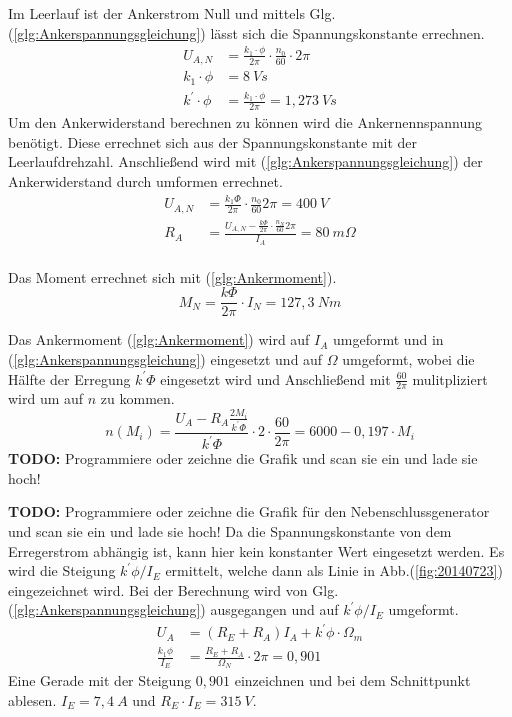 \begin{solution}
\begin{compactenum}
\item Im Leerlauf ist der Ankerstrom Null und mittels Glg.(\ref{glg:Ankerspannungsgleichung}) lässt sich die Spannungskonstante errechnen.
\begin{align}
U_{A,N} &= \frac{k_1 \cdot \phi}{2 \pi} \cdot \frac{n_0}{60} \cdot 2 \pi\\
k_1 \cdot \phi &= 8~Vs\\
k^{'} \cdot \phi &= \frac{k_1 \cdot \phi}{2 \pi} = 1,273~Vs
\end{align}
Um den Ankerwiderstand berechnen zu können wird die Ankernennspannung benötigt. Diese errechnet sich aus der Spannungskonstante mit der Leerlaufdrehzahl. Anschließend wird mit (\ref{glg:Ankerspannungsgleichung}) der Ankerwiderstand durch umformen errechnet.\\
\begin{align}
U_{A,N} &= \frac{k_1 \Phi}{2 \pi} \cdot \frac{n_0}{60} 2 \pi = 400~V\\
R_A &= \frac{U_{A,N} - \frac{k \Phi}{2 \pi} \cdot \frac{n_N}{60} 2 \pi}{I_A}=80~m \Omega\\
\end{align}
\item Das Moment errechnet sich mit (\ref{glg:Ankermoment}).\\
\begin{equation}
M_N=\frac{k \Phi}{2 \pi} \cdot I_N =127,3~Nm
\end{equation}
\item Das Ankermoment (\ref{glg:Ankermoment}) wird auf $I_A$ umgeformt und in (\ref{glg:Ankerspannungsgleichung}) eingesetzt und auf $\Omega$ umgeformt, wobei die Hälfte der Erregung $k^{'} \Phi$ eingesetzt wird und Anschließend mit $\frac{60}{2 \pi}$ mulitpliziert wird um auf $n$ zu kommen.
\begin{equation}
n(M_i) = \frac{U_A - R_A \frac{2 M_i}{k^{'} \Phi}}{k^{'}\Phi} \cdot 2 \cdot \frac{60}{2 \pi} =6000-0,197 \cdot M_i
\end{equation}
\textbf{TODO:} Programmiere oder zeichne die Grafik und scan sie ein und lade sie hoch!
\item \textbf{TODO:} Programmiere oder zeichne die Grafik für den Nebenschlussgenerator und scan sie ein und lade sie hoch! Da die Spannungskonstante von dem Erregerstrom abhängig ist, kann hier kein konstanter Wert eingesetzt werden. Es wird die Steigung $k^{'} \phi/I_E$ ermittelt, welche dann als Linie in Abb.(\ref{fig:20140723}) eingezeichnet wird. Bei der Berechnung wird von Glg.(\ref{glg:Ankerspannungsgleichung}) ausgegangen und auf $k^{'} \phi/I_E$ umgeformt.
\begin{align}
U_A &= (R_E +R_A)  I_A  + k^{'} \phi \cdot \Omega_m\\
\frac{k_1 \phi}{I_E} &= \frac{R_E +R_A}{\Omega_N}\cdot 2 \pi = 0,901
\end{align}
Eine Gerade mit der Steigung $0,901$ einzeichnen und bei dem Schnittpunkt ablesen. $I_E= 7,4~A$ und $R_E \cdot I_E = 315~V$.
\end{compactenum}
\end{solution}